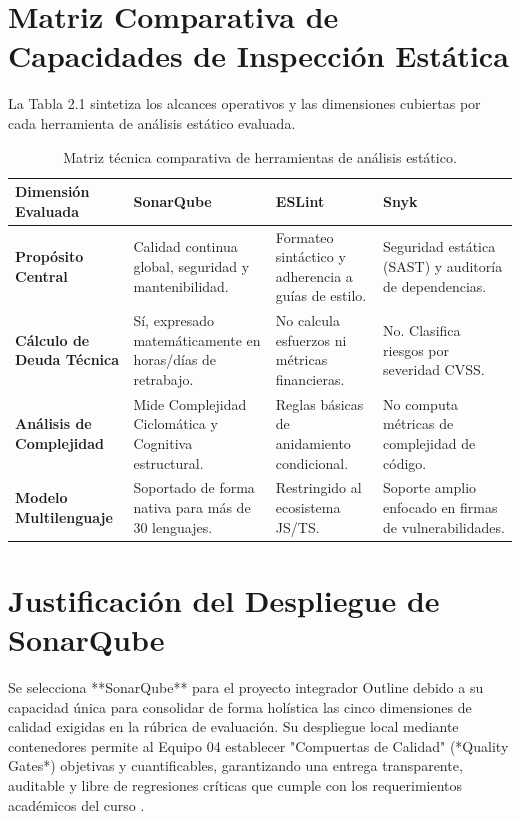 \documentclass[12pt,oneside]{report}
\begin{document}
\section{Matriz Comparativa de Capacidades de Inspección Estática}
La Tabla 2.1 sintetiza los alcances operativos y las dimensiones cubiertas por cada herramienta de análisis estático evaluada.

\begin{table}[H]
\centering
\caption{Matriz técnica comparativa de herramientas de análisis estático.}
\small
\begin{tabularx}{\textwidth}{|p{3.5cm}|X|X|X|}
\hline
\textbf{Dimensión Evaluada} & \textbf{SonarQube} & \textbf{ESLint} & \textbf{Snyk} \\
\hline
\textbf{Propósito Central} & Calidad continua global, seguridad y mantenibilidad. & Formateo sintáctico y adherencia a guías de estilo. & Seguridad estática (SAST) y auditoría de dependencias. \\
\hline
\textbf{Cálculo de Deuda Técnica} & Sí, expresado matemáticamente en horas/días de retrabajo. & No calcula esfuerzos ni métricas financieras. & No. Clasifica riesgos por severidad CVSS. \\
\hline
\textbf{Análisis de Complejidad} & Mide Complejidad Ciclomática y Cognitiva estructural. & Reglas básicas de anidamiento condicional. & No computa métricas de complejidad de código. \\
\hline
\textbf{Modelo Multilenguaje} & Soportado de forma nativa para más de 30 lenguajes. & Restringido al ecosistema JS/TS. & Soporte amplio enfocado en firmas de vulnerabilidades. \\
\hline
\end{tabularx}
\end{table}

\section{Justificación del Despliegue de SonarQube}
Se selecciona **SonarQube** para el proyecto integrador Outline debido a su capacidad única para consolidar de forma holística las cinco dimensiones de calidad exigidas en la rúbrica de evaluación. Su despliegue local mediante contenedores permite al Equipo 04 establecer "Compuertas de Calidad" (*Quality Gates*) objetivas y cuantificables, garantizando una entrega transparente, auditable y libre de regresiones críticas que cumple con los requerimientos académicos del curso \parencite{pressman2014}.
\end{document}
